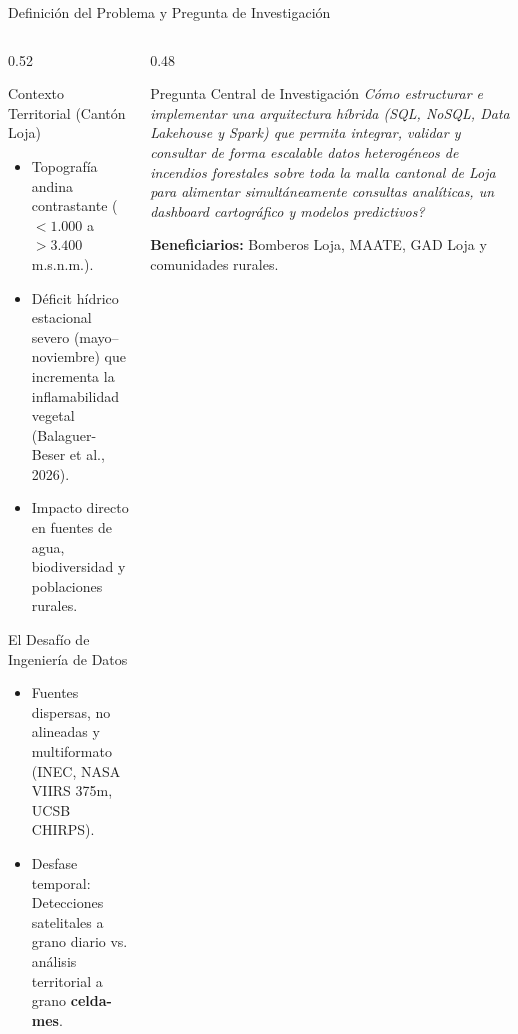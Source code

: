 \documentclass[aspectratio=169,11pt]{beamer}
\newcommand{\seccionactual}{Sustentaci\'on Final}
\begin{document}
\renewcommand{\seccionactual}{Problema \& Pregunta}
\begin{frame}{Definici\'on del Problema y Pregunta de Investigaci\'on}
  \begin{columns}
    \begin{column}{0.52\textwidth}
      \begin{block}{Contexto Territorial (Cant\'on Loja)}
        \begin{itemize}\small
          \item Topograf\'ia andina contrastante ($<1.000$ a $>3.400$\,m.s.n.m.).
          \item D\'eficit h\'idrico estacional severo (mayo--noviembre) que incrementa la inflamabilidad vegetal (Balaguer-Beser et al., 2026).
          \item Impacto directo en fuentes de agua, biodiversidad y poblaciones rurales.
        \end{itemize}
      \end{block}
      \begin{alertblock}{El Desaf\'io de Ingenier\'ia de Datos}
        \begin{itemize}\small
          \item Fuentes dispersas, no alineadas y multiformato (INEC, NASA VIIRS 375m, UCSB CHIRPS).
          \item Desfase temporal: Detecciones satelitales a grano diario vs. an\'alisis territorial a grano \textbf{celda-mes}.
        \end{itemize}
      \end{alertblock}
    \end{column}
    \begin{column}{0.48\textwidth}
      \begin{exampleblock}{Pregunta Central de Investigaci\'on}
        \small\textit{\textquestiondown C\'omo estructurar e implementar una arquitectura h\'ibrida (SQL, NoSQL, Data Lakehouse y Spark) que permita integrar, validar y consultar de forma escalable datos heterog\'eneos de incendios forestales sobre toda la malla cantonal de Loja para alimentar simult\'aneamente consultas anal\'iticas, un dashboard cartogr\'afico y modelos predictivos?}
      \end{exampleblock}
      \vspace{0.2cm}
      \textbf{Beneficiarios:} Bomberos Loja, MAATE, GAD Loja y comunidades rurales.
    \end{column}
  \end{columns}
\end{frame}
\end{document}
